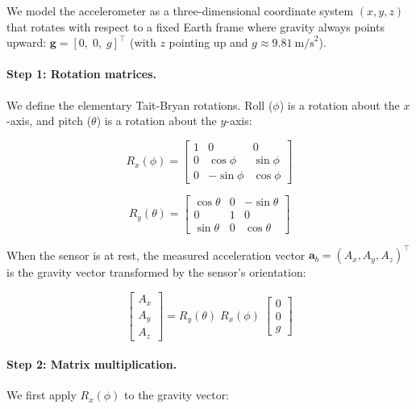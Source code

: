 We model the accelerometer as a three-dimensional coordinate system
$(x, y, z)$ that rotates with respect to a fixed Earth frame where gravity
always points upward: $\mathbf{g} = [0,\; 0,\; g]^\top$ (with $z$ pointing up
and $g \approx 9.81~\text{m/s}^2$).

\paragraph{Step 1: Rotation matrices.}
We define the elementary Tait-Bryan rotations. Roll ($\phi$) is a rotation
about the $x$-axis, and pitch ($\theta$) is a rotation about the $y$-axis:

\begin{equation}
  R_x(\phi) = \begin{bmatrix}
    1 & 0 & 0 \\
    0 & \cos\phi & \sin\phi \\
    0 & -\sin\phi & \cos\phi
  \end{bmatrix}
  \label{eq:Rx}
\end{equation}

\begin{equation}
  R_y(\theta) = \begin{bmatrix}
    \cos\theta & 0 & -\sin\theta \\
    0 & 1 & 0 \\
    \sin\theta & 0 & \cos\theta
  \end{bmatrix}
  \label{eq:Ry}
\end{equation}

When the sensor is at rest, the measured acceleration vector $\mathbf{a}_b =
(A_x, A_y, A_z)^\top$ is the gravity vector transformed by the sensor's
orientation:

\begin{equation}
  \begin{bmatrix} A_x \\ A_y \\ A_z \end{bmatrix}
  = R_y(\theta)\;R_x(\phi)\;\begin{bmatrix} 0 \\ 0 \\ g \end{bmatrix}
  \label{eq:accel_rotation}
\end{equation}

\paragraph{Step 2: Matrix multiplication.}
We first apply $R_x(\phi)$ to the gravity vector:

